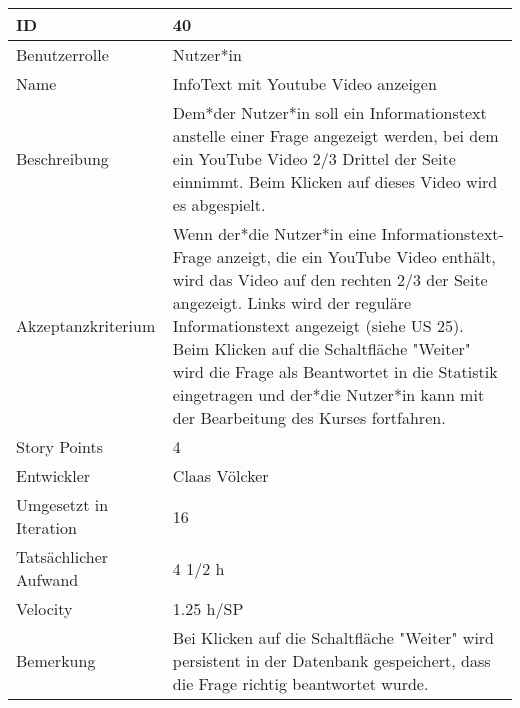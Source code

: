 \begin{tabularx}{\textwidth}{|p{}|X|}
	\hline
	ID & 40\\
	\hline
	Benutzerrolle & Nutzer*in\\
	\hline
	Name & InfoText mit Youtube Video anzeigen\\
	\hline
	Beschreibung & Dem*der Nutzer*in soll ein Informationstext anstelle einer Frage angezeigt werden, bei dem ein YouTube Video 2/3 Drittel der Seite einnimmt. Beim Klicken auf dieses Video wird es abgespielt.\\
	\hline
	Akzeptanzkriterium & Wenn der*die Nutzer*in eine Informationstext-Frage anzeigt, die ein YouTube Video enthält, wird das Video auf den rechten 2/3 der Seite angezeigt. Links wird der reguläre Informationstext angezeigt (siehe US 25). Beim Klicken auf die Schaltfläche "Weiter" wird die Frage als Beantwortet in die Statistik eingetragen und der*die Nutzer*in kann mit der Bearbeitung des Kurses fortfahren.\\
	\hline
	Story Points & 4\\
	\hline
	Entwickler & Claas Völcker\\
	\hline
	Umgesetzt in Iteration & 16\\
	\hline
	Tatsächlicher Aufwand & 4 1/2 h\\
	\hline
	Velocity & 1.25 h/SP\\
	\hline
	Bemerkung & Bei Klicken auf die Schaltfläche "Weiter" wird persistent in der Datenbank gespeichert, dass die Frage richtig beantwortet wurde.\\
	\hline
\end{tabularx}
\vspace{20pt}

